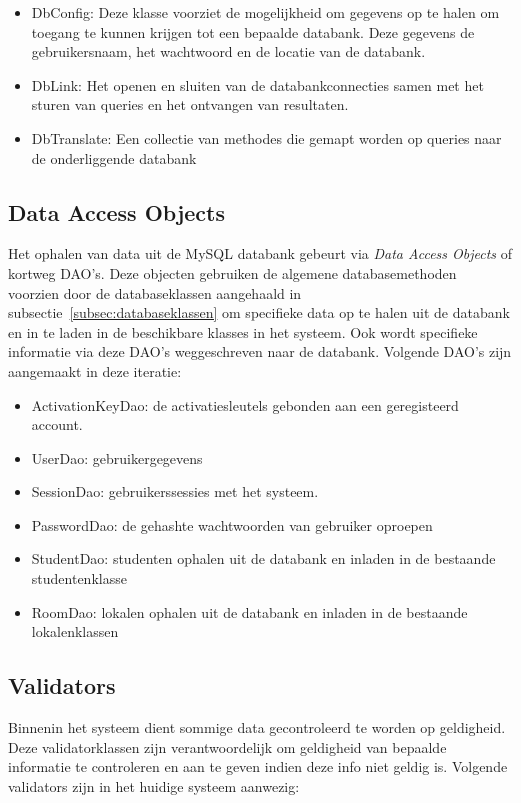 \begin{itemize}
	\item DbConfig: Deze klasse voorziet de mogelijkheid om gegevens op te halen om toegang te kunnen krijgen tot een bepaalde databank. 
	Deze gegevens de gebruikersnaam, het wachtwoord en de locatie van de databank. 
	\item DbLink: Het openen en sluiten van de databankconnecties samen met het sturen van queries en het ontvangen van resultaten.
	\item DbTranslate: Een collectie van methodes die gemapt worden op queries naar de onderliggende databank
\end{itemize} 

\subsection{Data Access Objects}
\label{subsec:dao}

Het ophalen van data uit de MySQL databank gebeurt via \emph{Data Access Objects} of kortweg DAO's. 
Deze objecten gebruiken de algemene databasemethoden voorzien door de databaseklassen aangehaald in subsectie~\ref{subsec:databaseklassen} om specifieke data op te halen uit de databank en in te laden in de beschikbare klasses in het systeem. 
Ook wordt specifieke informatie via deze DAO's weggeschreven naar de databank. 
Volgende DAO's zijn aangemaakt in deze iteratie:

\begin{itemize}
	\item ActivationKeyDao: de activatiesleutels gebonden aan een geregisteerd account. 
	\item UserDao: gebruikergegevens
	\item SessionDao: gebruikerssessies met het systeem.
	\item PasswordDao: de gehashte wachtwoorden van gebruiker oproepen
	\item StudentDao: studenten ophalen uit de databank en inladen in de bestaande studentenklasse
	\item RoomDao: lokalen ophalen uit de databank en inladen in de bestaande lokalenklassen
\end{itemize}

\subsection{Validators}
\label{subsec:validators}

Binnenin het systeem dient sommige data gecontroleerd te worden op geldigheid. 
Deze validatorklassen zijn verantwoordelijk om geldigheid van bepaalde informatie te controleren en aan te geven indien deze info niet geldig is. 
Volgende validators zijn in het huidige systeem aanwezig:

